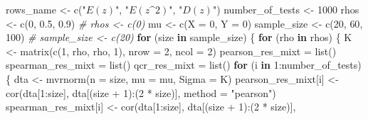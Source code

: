 \documentclass[
]{article}
\newenvironment{Shaded}{\begin{snugshade}}{\end{snugshade}}
\newcommand{\AttributeTok}[1]{\textcolor[rgb]{0.77,0.63,0.00}{#1}}
\newcommand{\CommentTok}[1]{\textcolor[rgb]{0.56,0.35,0.01}{\textit{#1}}}
\newcommand{\ControlFlowTok}[1]{\textcolor[rgb]{0.13,0.29,0.53}{\textbf{#1}}}
\newcommand{\DecValTok}[1]{\textcolor[rgb]{0.00,0.00,0.81}{#1}}
\newcommand{\FloatTok}[1]{\textcolor[rgb]{0.00,0.00,0.81}{#1}}
\newcommand{\FunctionTok}[1]{\textcolor[rgb]{0.00,0.00,0.00}{#1}}
\newcommand{\NormalTok}[1]{#1}
\newcommand{\OtherTok}[1]{\textcolor[rgb]{0.56,0.35,0.01}{#1}}
\newcommand{\SpecialCharTok}[1]{\textcolor[rgb]{0.00,0.00,0.00}{#1}}
\newcommand{\StringTok}[1]{\textcolor[rgb]{0.31,0.60,0.02}{#1}}
\begin{document}
\begin{Shaded}
\begin{Highlighting}[]
\NormalTok{rows\_name }\OtherTok{\textless{}{-}} \FunctionTok{c}\NormalTok{(}\StringTok{"$E(z)$"}\NormalTok{, }\StringTok{"$E(z\^{}2)$"}\NormalTok{, }\StringTok{"$D(z)$"}\NormalTok{)}
\NormalTok{number\_of\_tests }\OtherTok{\textless{}{-}} \DecValTok{1000}
\NormalTok{rhos }\OtherTok{\textless{}{-}} \FunctionTok{c}\NormalTok{(}\DecValTok{0}\NormalTok{, }\FloatTok{0.5}\NormalTok{, }\FloatTok{0.9}\NormalTok{)}
\CommentTok{\# rhos \textless{}{-} c(0)}
\NormalTok{mu }\OtherTok{\textless{}{-}} \FunctionTok{c}\NormalTok{(}\AttributeTok{X =} \DecValTok{0}\NormalTok{, }\AttributeTok{Y =} \DecValTok{0}\NormalTok{)}
\NormalTok{sample\_size }\OtherTok{\textless{}{-}} \FunctionTok{c}\NormalTok{(}\DecValTok{20}\NormalTok{, }\DecValTok{60}\NormalTok{, }\DecValTok{100}\NormalTok{)}
\CommentTok{\# sample\_size \textless{}{-} c(20)}
\ControlFlowTok{for}\NormalTok{ (size }\ControlFlowTok{in}\NormalTok{ sample\_size) \{}
    \ControlFlowTok{for}\NormalTok{ (rho }\ControlFlowTok{in}\NormalTok{ rhos) \{}
\NormalTok{        K }\OtherTok{\textless{}{-}} \FunctionTok{matrix}\NormalTok{(}\FunctionTok{c}\NormalTok{(}\DecValTok{1}\NormalTok{, rho, rho, }\DecValTok{1}\NormalTok{), }\AttributeTok{nrow =} \DecValTok{2}\NormalTok{, }\AttributeTok{ncol =} \DecValTok{2}\NormalTok{)}
\NormalTok{        pearson\_res\_mixt }\OtherTok{=} \FunctionTok{list}\NormalTok{()}
\NormalTok{        spearman\_res\_mixt }\OtherTok{=} \FunctionTok{list}\NormalTok{()}
\NormalTok{        qcr\_res\_mixt }\OtherTok{=} \FunctionTok{list}\NormalTok{()}
        \ControlFlowTok{for}\NormalTok{ (i }\ControlFlowTok{in} \DecValTok{1}\SpecialCharTok{:}\NormalTok{number\_of\_tests) \{}
\NormalTok{            dta }\OtherTok{\textless{}{-}} \FunctionTok{mvrnorm}\NormalTok{(}\AttributeTok{n =}\NormalTok{ size, }\AttributeTok{mu =}\NormalTok{ mu, }\AttributeTok{Sigma =}\NormalTok{ K)}
\NormalTok{            pearson\_res\_mixt[i] }\OtherTok{\textless{}{-}} \FunctionTok{cor}\NormalTok{(dta[}\DecValTok{1}\SpecialCharTok{:}\NormalTok{size], dta[(size }\SpecialCharTok{+} \DecValTok{1}\NormalTok{)}\SpecialCharTok{:}\NormalTok{(}\DecValTok{2} \SpecialCharTok{*}\NormalTok{ size)], }\AttributeTok{method =} \StringTok{"pearson"}\NormalTok{)}
\NormalTok{            spearman\_res\_mixt[i] }\OtherTok{\textless{}{-}} \FunctionTok{cor}\NormalTok{(dta[}\DecValTok{1}\SpecialCharTok{:}\NormalTok{size], dta[(size }\SpecialCharTok{+} \DecValTok{1}\NormalTok{)}\SpecialCharTok{:}\NormalTok{(}\DecValTok{2} \SpecialCharTok{*}\NormalTok{ size)], }

\end{Highlighting}
\end{Shaded}
\end{document}
